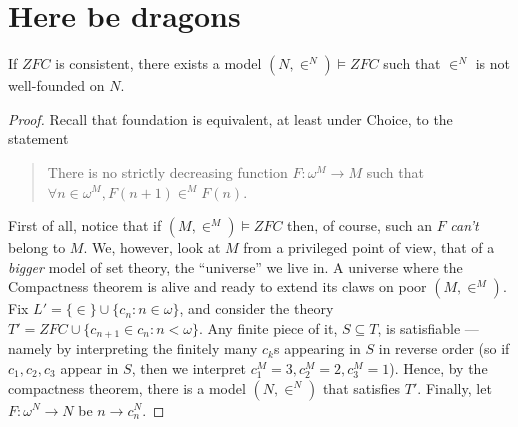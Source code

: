 \documentclass[twoside,openright,titlepage,numbers=noenddot,%
               headinclude,footinclude,cleardoublepage=empty,abstract=on,
               BCOR=23mm,paper=letter,fontsize=11pt
               ]{scrreprt}
\begin{document}
\section{Here be dragons}
\begin{theorem}
    If $ZFC$ is consistent, there exists a model $(N,\in^N) \models ZFC$ such that $\in^N$ is not well-founded on $N$.
\end{theorem}
\begin{proof}
    Recall that foundation is equivalent, at least under Choice, to the statement
    \begin{quote}
        There is no strictly decreasing function $F: \omega^{M} \to M$ such that $\forall n \in \omega^{M}, F(n+1) \in^M F(n)$.
    \end{quote}
    First of all, notice that if $(M,\in^M) \models ZFC$ then, of course, such an $F$ \textit{can't} belong to $M$. We, however, look at $M$ from a privileged point of view, that of a \textit{bigger} model of set theory, the ``universe'' we live in. A universe where the Compactness theorem is alive and ready to extend its claws on poor $(M, \in^M)$. \\
    Fix $L' = \{\in\} \cup \{c_n: n \in \omega\}$, and consider the theory $T' = ZFC \cup \{ c_{n+1} \in c_n: n < \omega \}$. Any finite piece of it, $S \subseteq T$, is satisfiable --- namely by interpreting the finitely many $c_k$s appearing in $S$ in reverse order (so if $c_1, c_2, c_3$ appear in $S$, then we interpret $c_1^M = 3, c_2^M = 2, c_3^M = 1$). Hence, by the compactness theorem, there is a model $(N, \in^N)$ that satisfies $T'$. Finally, let $F: \omega^N \to N$ be $n \to c_n^N$.
\end{proof}
\printbibliography
\end{document}
